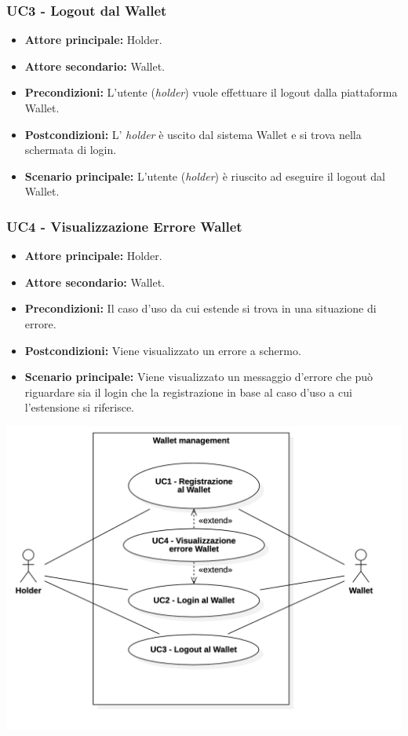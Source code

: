 \subsubsection{UC3 - Logout dal Wallet}
\begin{itemize}
\item \textbf{Attore principale:} Holder.
\item \textbf{Attore secondario:} Wallet.
\item \textbf{Precondizioni:} L'utente (\textit{holder}) vuole effettuare il logout dalla piattaforma Wallet.
\item \textbf{Postcondizioni:} L' \textit{holder} è uscito dal sistema Wallet e si trova nella schermata di login.
\item \textbf{Scenario principale:} L'utente (\textit{holder}) è riuscito ad eseguire il logout dal Wallet. 
\end{itemize}

\subsubsection{UC4 - Visualizzazione Errore Wallet}
\begin{itemize}
\item \textbf{Attore principale:} Holder.
\item \textbf{Attore secondario:} Wallet.
\item \textbf{Precondizioni:} Il caso d'uso da cui estende si trova in una situazione di errore.
\item \textbf{Postcondizioni:} Viene visualizzato un errore a schermo. 
\item \textbf{Scenario principale:} Viene visualizzato un messaggio d’errore che può riguardare sia il login che la registrazione in base al caso d’uso a cui l’estensione si riferisce.
\end{itemize}

\begin{center}
  \includegraphics[scale = 0.38]{./res/img/WalletManagement.png}
\end{center}

